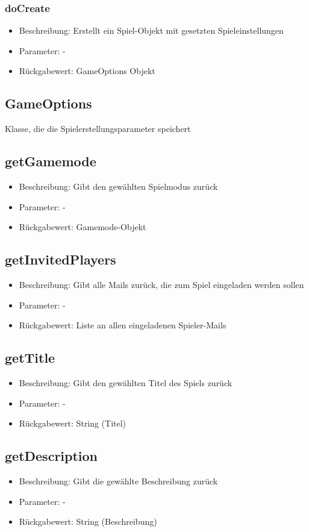 \documentclass[a4paper]{scrreprt}
\begin{document}
	\subsubsection{doCreate}
	\begin{itemize}
		\item Beschreibung: Erstellt ein Spiel-Objekt mit gesetzten Spieleinstellungen
		\item Parameter: -
		\item Rückgabewert: GameOptions Objekt
	\end{itemize}

	\subsection{GameOptions}
	Klasse, die die Spielerstellungsparameter speichert
	\subsection{getGamemode}
	\begin{itemize}
		\item Beschreibung: Gibt den gewählten Spielmodus zurück
		\item Parameter: -
		\item Rückgabewert: Gamemode-Objekt
	\end{itemize}
	\subsection{getInvitedPlayers}
	\begin{itemize}
		\item Beschreibung: Gibt alle Mails zurück, die zum Spiel eingeladen werden sollen
		\item Parameter: -
		\item Rückgabewert: Liste an allen eingeladenen Spieler-Mails
	\end{itemize}
	\subsection{getTitle}
	\begin{itemize}
		\item Beschreibung: Gibt den gewählten Titel des Spiels zurück
		\item Parameter: -
		\item Rückgabewert: String (Titel)
	\end{itemize}
	\subsection{getDescription}
	\begin{itemize}
		\item Beschreibung: Gibt die gewählte Beschreibung zurück
		\item Parameter: -
		\item Rückgabewert: String (Beschreibung)
	\end{itemize}
\end{document}
